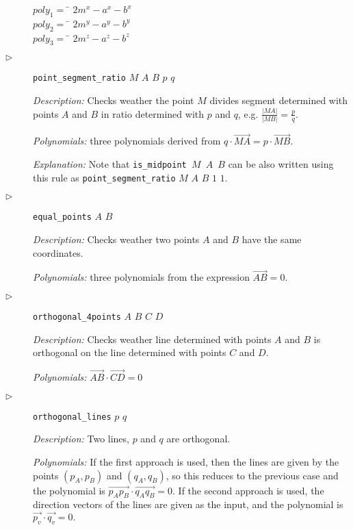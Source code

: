 \documentclass[final,1p,times,authoryear]{elsarticle}
\begin{document}
\begin{description}
\begin{tabbing}
$poly_1 = $ \= $2m^x - a^x - b^x$ \\ 
$poly_2 = $ \= $2m^y - a^y - b^y$ \\ 
$poly_3 = $ \= $2m^z - a^z - b^z$
\end{tabbing}

\item[$\triangleright$] {\tt point\_segment\_ratio} $M$ $A$ $B$ $p$ $q$

{\em Description:} Checks weather the point $M$ divides segment
determined with points $A$ and $B$ in ratio determined with $p$ and
$q$, e.g. $\frac{|MA|}{|MB|} = \frac{p}{q}$.

{\em Polynomials:} three polynomials derived from
$q\cdot \overrightarrow{MA} = p\cdot \overrightarrow{MB}$.

{\em Explanation:} Note that {\tt is\_midpoint $M$ $A$ $B$} can be
also written using this rule as {\tt point\_segment\_ratio} $M$ $A$
$B$ $1$ $1$.

\item[$\triangleright$] {\tt equal\_points} $A$ $B$

{\em Description:} Checks weather two points $A$ and $B$ have the same
coordinates.

{\em Polynomials:} three polynomials from the expression
$\overrightarrow{AB} = 0$.

\item[$\triangleright$] {\tt orthogonal\_4points} $A$ $B$ $C$ $D$

{\em Description:} Checks weather line determined with points $A$
and $B$ is orthogonal on the line determined with points $C$ and
$D$.

{\em Polynomials:} $\overrightarrow{AB} \cdot \overrightarrow{CD} = 0$

\item[$\triangleright$] {\tt orthogonal\_lines} $p$ $q$

{\em Description:} Two lines, $p$ and $q$ are orthogonal.

{\em Polynomials:} If the first approach is used, then the lines are
given by the points $(p_A, p_B)$ and $(q_A, q_B)$, so this reduces to
the previous case and the polynomial is
$\overrightarrow{p_Ap_B} \cdot \overrightarrow{q_Aq_B} = 0$. If the
second approach is used, the direction vectors of the lines are given
as the input, and the polynomial is
$\overrightarrow{p_v} \cdot \overrightarrow{q_v} = 0.$


\end{description}
\end{document}
